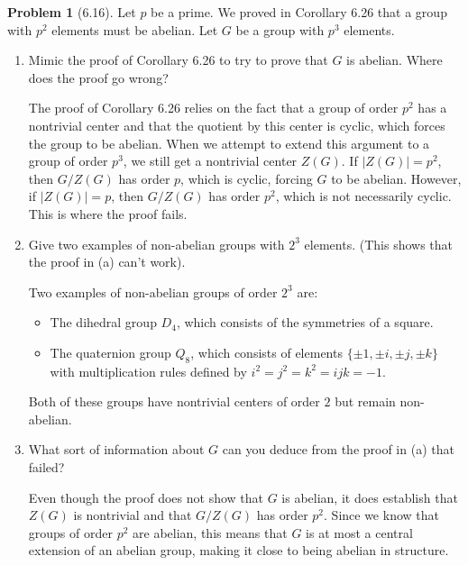 \documentclass[12pt]{article}
\theoremstyle{definition}
\newtheorem{problem}{Problem}
\begin{document}
\begin{problem}[6.16]
    Let $p$ be a prime. We proved in Corollary 6.26 that a group with $p^2$ elements must be abelian.
    Let $G$ be a group with $p^3$ elements.
    \begin{enumerate}[label=(\alph*)]
        \item Mimic the proof of Corollary 6.26 to try to prove that $G$ is abelian. Where does the proof go wrong?
        
        \begin{solution}
        The proof of Corollary 6.26 relies on the fact that a group of order $p^2$ has a nontrivial center and that the quotient by this center is cyclic, which forces the group to be abelian. When we attempt to extend this argument to a group of order $p^3$, we still get a nontrivial center $Z(G)$. If $|Z(G)| = p^2$, then $G/Z(G)$ has order $p$, which is cyclic, forcing $G$ to be abelian. However, if $|Z(G)| = p$, then $G/Z(G)$ has order $p^2$, which is not necessarily cyclic. This is where the proof fails.
        \end{solution}

        \item Give two examples of non-abelian groups with $2^3$ elements. (This shows that the proof in (a) can't work).
        
        \begin{solution}
        Two examples of non-abelian groups of order $2^3$ are:
        \begin{itemize}
            \item The dihedral group $D_4$, which consists of the symmetries of a square.
            \item The quaternion group $Q_8$, which consists of elements $\{ \pm 1, \pm i, \pm j, \pm k \}$ with multiplication rules defined by $i^2 = j^2 = k^2 = ijk = -1$.
        \end{itemize}
        Both of these groups have nontrivial centers of order $2$ but remain non-abelian.
        \end{solution}

        \item What sort of information about $G$ can you deduce from the proof in (a) that failed?
        
        \begin{solution}
        Even though the proof does not show that $G$ is abelian, it does establish that $Z(G)$ is nontrivial and that $G/Z(G)$ has order $p^2$. Since we know that groups of order $p^2$ are abelian, this means that $G$ is at most a central extension of an abelian group, making it close to being abelian in structure.
        \end{solution}


\end{enumerate}
\end{problem}
\end{document}
